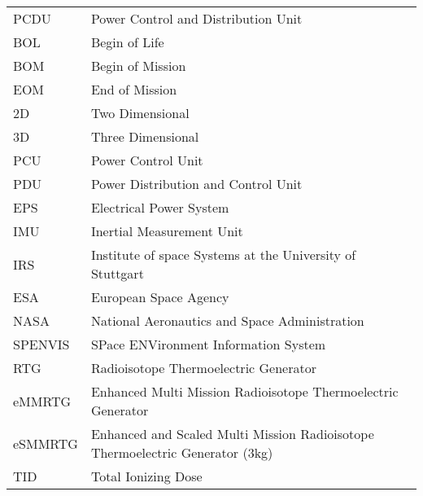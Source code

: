 \begin{table}[htb]
\begin{tabular}[l]{ll}
PCDU    & Power Control and Distribution Unit \\
BOL     & Begin of Life \\
BOM     & Begin of Mission \\
EOM     & End of Mission \\
2D		& Two Dimensional \\
3D		& Three Dimensional \\
PCU     & Power Control Unit \\
PDU     & Power Distribution and Control Unit \\
EPS     & Electrical Power System \\
IMU     & Inertial Measurement Unit \\
IRS     & Institute of space Systems at the University of Stuttgart \\
ESA		&	European Space Agency	\\
NASA    &   National Aeronautics and Space Administration \\
SPENVIS	&	SPace ENVironment Information System	\\
RTG     & Radioisotope Thermoelectric Generator \\
eMMRTG  & Enhanced Multi Mission Radioisotope Thermoelectric Generator \\
eSMMRTG & Enhanced and Scaled Multi Mission Radioisotope Thermoelectric Generator (3kg) \\
TID		& Total Ionizing Dose \\

\end{tabular}
\end{table}

\cleardoublepage
